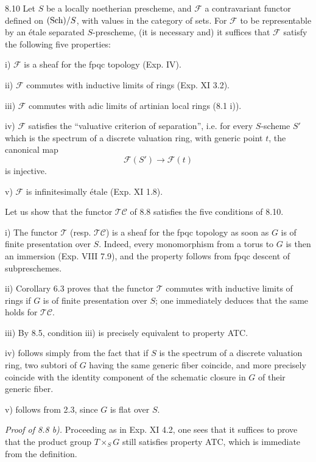 \begin{lemma}{8.10}\label{XV.8.10}
Let $S$ be a locally noetherian prescheme, and $\mathscr F$ a contravariant functor defined on $\textup{(Sch)}/S$, with values in the category of sets. For $\mathscr F$ to be representable by an étale separated $S$-prescheme, (it is necessary and) it suffices that $\mathscr F$ satisfy the following five properties:

\noindent i) $\mathscr F$ is a sheaf for the fpqc topology (Exp. IV).

\noindent ii) $\mathscr F$ commutes with inductive limits of rings (Exp. XI 3.2).

\noindent iii) $\mathscr F$ commutes with adic limits of artinian local rings (8.1 i)).

\noindent iv) $\mathscr F$ satisfies the ``valuative criterion of separation'', i.e. for every $S$-scheme $S'$ which is the spectrum of a discrete valuation ring, with generic point $t$, the canonical map
\[
\mathscr F(S')\longrightarrow\mathscr F(t)
\]
is injective.

\noindent v) $\mathscr F$ is infinitesimally étale (Exp. XI 1.8).
\end{lemma}
Let us show that the functor $\mathscr{TC}$ of 8.8 satisfies the five conditions of 8.10.

i) The functor $\mathscr T$ (resp. $\mathscr{TC}$) is a sheaf for the fpqc topology as soon as $G$ is of finite presentation over $S$. Indeed, every monomorphism from a torus to $G$ is then an immersion (Exp. VIII 7.9), and the property follows from fpqc descent of subpreschemes.

ii) Corollary 6.3 proves that the functor $\mathscr T$ commutes with inductive limits of rings if $G$ is of finite presentation over $S$; one immediately deduces that the same holds for $\mathscr{TC}$.

iii) By 8.5, condition iii) is precisely equivalent to property ATC.

iv) follows simply from the fact that if $S$ is the spectrum of a discrete valuation ring, two subtori of $G$ having the same generic fiber coincide, and more precisely coincide with the identity component of the schematic closure in $G$ of their generic fiber.

v) follows from 2.3, since $G$ is flat over $S$.

\par\noindent\emph{Proof of 8.8 b).}
Proceeding as in Exp. XI 4.2, one sees that it suffices to prove that the product group $T\times_S G$ still satisfies property ATC, which is immediate from the definition.

